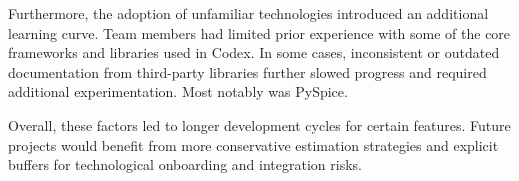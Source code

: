 Furthermore, the adoption of unfamiliar technologies introduced an additional learning curve. Team members had limited prior experience with some of the core frameworks and libraries used in Codex. In some cases, inconsistent or outdated documentation from third-party libraries further slowed progress and required additional experimentation. Most notably was PySpice.

Overall, these factors led to longer development cycles for certain features. Future projects would benefit from more conservative estimation strategies and explicit buffers for technological onboarding and integration risks.
